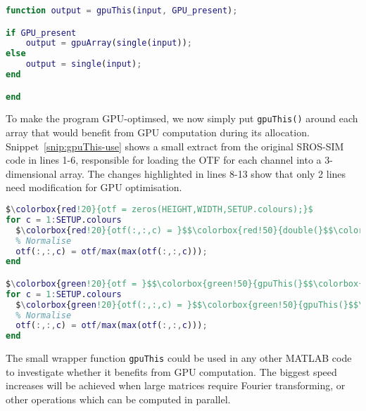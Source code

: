 \begin{lstfloat}
\begin{lstlisting}[language=matlab,caption={A simple helper function, \texttt{gpuThis()}, sends an array to graphics memory if a GPU is available, but leaves the array in CPU memory if not},label={snip:gpu-array},frame=single]
function output = gpuThis(input, GPU_present);

if GPU_present
    output = gpuArray(single(input));
else
    output = single(input);
end

end
\end{lstlisting}
\end{lstfloat}

To make the program GPU-optimsed, we now simply put \texttt{gpuThis()} around each array that would benefit from GPU computation during its allocation. 
Snippet~\ref{snip:gpuThis-use} shows a small extract from the original SROS-SIM code in lines 1-6, responsible for loading the OTF for each channel into a 3-dimensional array. 
The changes highlighted in lines 8-13 show that only 2 lines need modification for GPU optimisation. 

\setlength\fboxsep{0pt}
\begin{lstfloat}
\begin{lstlisting}[language=matlab,caption={The function \texttt{gpuThis()} should be wrapped around new arrays when they are preallocated},label={snip:gpuThis-use},frame=single,escapechar=$]
$\colorbox{red!20}{otf = zeros(HEIGHT,WIDTH,SETUP.colours);}$
for c = 1:SETUP.colours
  $\colorbox{red!20}{otf(:,:,c) = }$$\colorbox{red!50}{double(}$$\colorbox{red!20}{imread([DATA.OTF\_path\{c\}, DATA.OTF\_name\{c\}, DATA.OTF\_suffix\{c\}]));}$
  % Normalise
  otf(:,:,c) = otf/max(max(otf(:,:,c)));
end

$\colorbox{green!20}{otf = }$$\colorbox{green!50}{gpuThis(}$$\colorbox{green!20}{zeros(HEIGHT,WIDTH,SETUP.colours)}$$\colorbox{green!50}{, gpuPresent)}$$\colorbox{green!20}{;}$
for c = 1:SETUP.colours
  $\colorbox{green!20}{otf(:,:,c) = }$$\colorbox{green!50}{gpuThis(}$$\colorbox{green!20}{imread([DATA.OTF\_path\{c\}, DATA.OTF\_name\{c\}, DATA.OTF\_suffix\{c\}])}$$\colorbox{green!50}{, gpuPresent}$$\colorbox{green!20}{);}$
  % Normalise
  otf(:,:,c) = otf/max(max(otf(:,:,c)));
end
\end{lstlisting}
\end{lstfloat}

The small wrapper function \texttt{gpuThis} could be used in any other MATLAB code to investigate whether it benefits from GPU computation. 
The biggest speed increases will be achieved when large matrices require Fourier transforming, or other operations which can be computed in parallel. 

